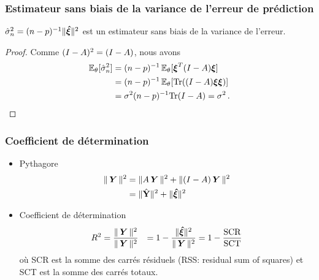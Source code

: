 \begin{frame}
\frametitle{Estimateur sans biais de la variance de l'erreur de prédiction}
\begin{theo}
$\hat{\sigma}_n^2= (n-p)^{-1} \| \boldsymbol{\hat{\xi}} \|^2$ est un estimateur sans biais de la variance de l'erreur.
\end{theo}
\begin{proof}
Comme $(I-A)^2= (I-A)$, nous avons
\begin{align*}
\operatorname{{\mathbb E}}_{\theta}[\hat{\sigma}_n^2] &= (n-p)^{-1} \operatorname{{\mathbb E}}_{\theta}[ \boldsymbol{\xi}^T (I-A) \boldsymbol{\xi}] \\
                             &= (n-p)^{-1} \operatorname{{\mathbb E}}_{\theta}[ \mathrm{Tr}( (I-A) \boldsymbol{\xi} \boldsymbol{\xi}) ] \\
                             &= \sigma^2 (n-p)^{-1} \mathrm{Tr}(I-A)= \sigma^2 \,.
\end{align*}
\end{proof}
\end{frame}

\begin{frame}
\frametitle{Coefficient de détermination}
\begin{itemize}
\item \alert{Pythagore}
\begin{align*}
\| \operatorname{\boldsymbol{Y}} \|^2 &= \| A \operatorname{\boldsymbol{Y}} \|^2 + \| (I - A) \operatorname{\boldsymbol{Y}} \|^2 \\
            &= \| \hat{\mathbf{Y}} \|^2 + \| \boldsymbol{\hat{\xi}} \|^2
\end{align*}
\item \alert{Coefficient de détermination}
\begin{align*}
R^2 &= \frac{\|\operatorname{\boldsymbol{Y}}\|^2}{\|\operatorname{\boldsymbol{Y}}\|^2}
    &= 1 - \frac{\| \boldsymbol{\hat{\xi}} \|^2}{\|\operatorname{\boldsymbol{Y}}\|^2} = 1 - \frac{\mathrm{SCR}}{\mathrm{SCT}}
\end{align*}
où \alert{SCR} est la somme des carrés résiduels (RSS: residual sum of squares) et \alert{SCT} est la somme des carrés totaux.
\end{itemize}
\end{frame}






